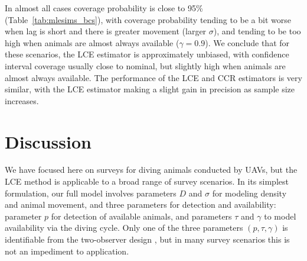 \documentclass[useAMS, usenatbib, referee]{biom}\usepackage[]{graphicx}\usepackage[]{color}
\begin{document}
In almost all cases coverage probability is close to 95\% (Table~\ref{tab:mlesims_bcs}), with coverage probability tending to be a bit worse when lag is short and there is greater movement (larger $\sigma$), and tending to be too high when animals are almost always available ($\gamma=0.9$). We conclude that for these scenarios, the LCE estimator is approximately unbiased, with confidence interval coverage usually close to nominal, but slightly high when animals are almost always available. The performance of the LCE and CCR estimators is very similar, with the LCE estimator making a slight gain in precision as sample size increases.


\section{Discussion\label{sec:discussion}}


We have focused here on surveys for diving animals conducted by UAVs, but the LCE method is applicable to a broad range of survey scenarios. In its simplest formulation, our full model involves parameters $D$ and $\sigma$ for modeling density and animal movement, and three parameters for detection and availability: parameter $p$ for detection of available animals, and parameters $\tau$ and $\gamma$ to model availability via the diving cycle. Only one of the three parameters $(p, \tau, \gamma)$ is identifiable from the two-observer design \citep{Stevenson+al:19}, but in many survey scenarios this is not an impediment to application.
\end{document}
